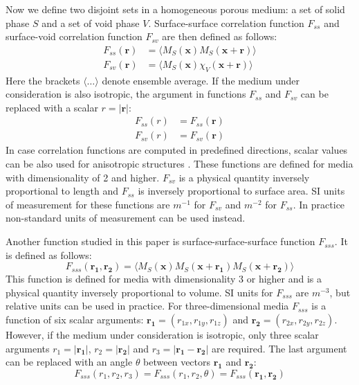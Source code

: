 \documentclass[preprint]{elsarticle}
\begin{document}
Now we define two disjoint sets in a homogeneous porous medium: a set of solid
phase $S$ and a set of void phase $V$. Surface-surface correlation function
$F_{ss}$ and surface-void correlation function $F_{sv}$ are then defined as
follows: \cite{Torquato_book}
\begin{align}
  F_{ss}(\bm{r}) &= \langle M_S(\bm{x}) M_S(\bm{x} + \bm{r}) \rangle \label{eq:fss} \\
  F_{sv}(\bm{r}) &= \langle M_S(\bm{x}) \chi_V(\bm{x} + \bm{r}) \rangle
  \label{eq:fsv}
\end{align}
Here the brackets $\langle \dots \rangle$ denote ensemble average. If the medium
under consideration is also isotropic, the argument in functions $F_{ss}$ and
$F_{sv}$ can be replaced with a scalar $r = |\bm{r}|$:
\begin{align}
  F_{ss}(r) &= F_{ss}(\bm{r}) \\
  F_{sv}(r) &= F_{sv}(\bm{r})
\end{align}
In case correlation functions are computed in predefined directions, scalar
values can be also used for anisotropic structures
\cite{jiao2014chawla,EPL1}. These functions are defined for media with
dimensionality of 2 and higher. $F_{sv}$ is a physical quantity inversely
proportional to length and $F_{ss}$ is inversely proportional to surface
area. SI units of measurement for these functions are $m^{-1}$ for $F_{sv}$
and $m^{-2}$ for $F_{ss}$. In practice non-standard units of measurement can be
used instead.

Another function studied in this paper is surface-surface-surface function
$F_{sss}$. It is defined as follows:
\begin{equation}
  F_{sss}(\bm{r_1}, \bm{r_2}) = \langle M_S(\bm{x}) M_S(\bm{x} + \bm{r_1})
  M_S(\bm{x} + \bm{r_2}) \rangle
  \label{eq:fsss}
\end{equation}
This function is defined for media with dimensionality 3 or higher and is a
physical quantity inversely proportional to volume. SI units for $F_{sss}$ are
$m^{-3}$, but relative units can be used in practice. For three-dimensional media
$F_{sss}$ is a function of six scalar arguments:
$\bm{r_1} = (r_{1x}, r_{1y}, r_{1z})$ and $\bm{r_2} = (r_{2x}, r_{2y}, r_{2z})$.
However, if the medium under consideration is isotropic, only three scalar
arguments $r_1 = |\bm{r_1}|$, $r_2 = |\bm{r_2}|$ and $r_3 = |\bm{r_1} - \bm{r_2}|$
are required. The last argument can be replaced with an angle $\theta$ between
vectors $\bm{r_1}$ and $\bm{r_2}$:
\begin{equation}
  F_{sss}(r_1, r_2, r_3) = F_{sss}(r_1, r_2, \theta) = F_{sss}(\bm{r_1}, \bm{r_2})
\end{equation}
\end{document}
